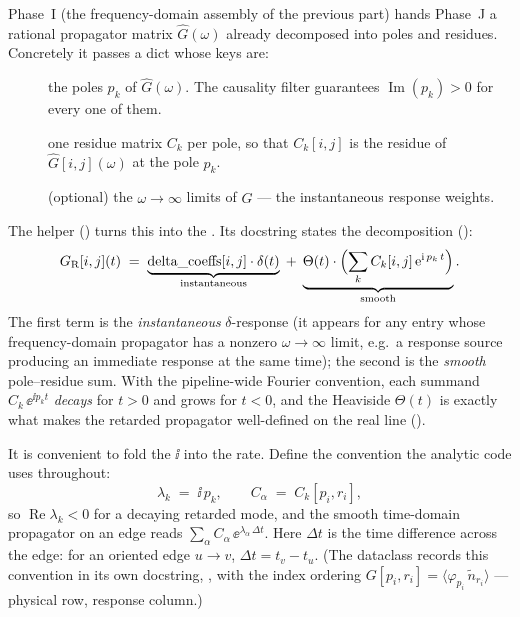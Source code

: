 Phase~I (the frequency-domain assembly of the previous part) hands Phase~J a
rational propagator matrix $\hat G(\omega)$ already decomposed into poles and
residues. Concretely it passes a  dict whose keys are:
\begin{description}
  \item[] the poles $p_k$ of $\hat G(\omega)$. The causality
        filter guarantees $\operatorname{Im}(p_k) > 0$ for every one of them.
  \item[] one residue matrix $C_k$ per pole, so that
        $C_k[i,j]$ is the residue of $\hat G[i,j](\omega)$ at the pole $p_k$.
  \item[] (optional) the $\omega \to \infty$ limits of
        $\hat G$ --- the instantaneous response weights.
\end{description}
The helper  () turns this
into the . Its docstring states the
decomposition ():
\begin{equation}
  G_{\mathrm R}[i,j](t)
  \;=\;
  \underbrace{\text{delta\_coeffs}[i,j]\cdot \delta(t)}_{\text{instantaneous}}
  \;+\;
  \underbrace{\Theta(t)\cdot\Bigl(\sum_k C_k[i,j]\,\mathrm{e}^{\mathrm{i}\,p_k\,t}\Bigr)}_{\text{smooth}} .
  \label{eq:GR}
\end{equation}
The first term is the \emph{instantaneous} $\delta$-response (it appears for any
entry whose frequency-domain propagator has a nonzero $\omega\to\infty$ limit,
e.g.\ a response source producing an immediate response at the same time); the
second is the \emph{smooth} pole--residue sum. With the pipeline-wide Fourier
convention, each summand $C_k\,\ee^{\ii p_k t}$ \emph{decays} for $t>0$ and grows
for $t<0$, and the Heaviside $\Theta(t)$ is exactly what makes the retarded
propagator well-defined on the real line ().

It is convenient to fold the $\ii$ into the rate. Define the 
convention the analytic code uses throughout:
\begin{equation}
  \lambda_k \;=\; \ii\,p_k ,
  \qquad
  C_\alpha \;=\; C_k[p_i, r_i] ,
  \label{eq:mode}
\end{equation}
so $\operatorname{Re}\lambda_k < 0$ for a decaying retarded mode, and the smooth
time-domain propagator on an edge reads $\sum_\alpha C_\alpha\,
\ee^{\lambda_\alpha\,\Delta t}$. Here $\Delta t$ is the time difference across the
edge: for an oriented edge $u \to v$, $\Delta t = t_v - t_u$. (The dataclass
 records this convention in its own docstring,
, with the index ordering
$G[p_i, r_i] = \langle \varphi_{p_i}\,\tilde n_{r_i}\rangle$ --- physical row,
response column.)


